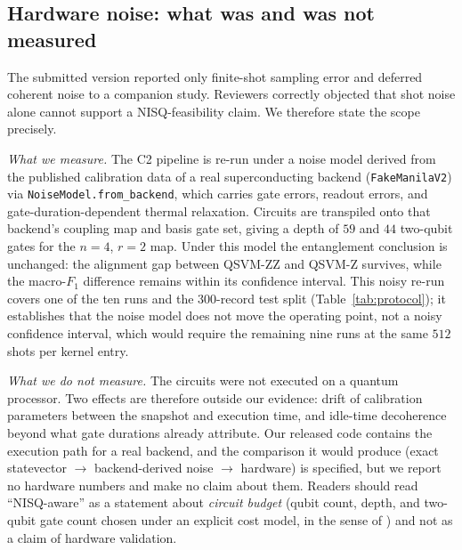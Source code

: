 \subsection{Hardware noise: what was and was not measured}
\begin{revbody}

The submitted version reported only finite-shot sampling error and deferred
coherent noise to a companion study. Reviewers correctly objected that shot
noise alone cannot support a NISQ-feasibility claim. We therefore state the
scope precisely.

\emph{What we measure.} The C2 pipeline is re-run under a noise model derived
from the published calibration data of a real superconducting backend
(\texttt{FakeManilaV2}) \cite{ref27} via \texttt{NoiseModel.from\_backend}, which
carries gate errors, readout errors, and gate-duration-dependent thermal
relaxation.
Circuits are transpiled onto that backend's coupling map and basis gate set,
giving a depth of $59$ and $44$ two-qubit gates for the $n=4$, $r=2$ map.
Under this model the entanglement conclusion is unchanged: the alignment gap
between QSVM-ZZ and QSVM-Z survives, while the macro-$F_1$ difference remains
within its confidence interval. This noisy re-run covers one of the ten runs
and the $300$-record test split (Table~\ref{tab:protocol}); it establishes
that the noise model does not move the operating point, not a noisy confidence
interval, which would require the remaining nine runs at the same $512$ shots
per kernel entry.

\emph{What we do not measure.} The circuits were not executed on a quantum
processor. Two effects are therefore outside our evidence: drift of calibration
parameters between the snapshot and execution time, and idle-time decoherence
beyond what gate durations already attribute. Our released code contains the
execution path for a real backend, and the comparison it would produce
(exact statevector $\rightarrow$ backend-derived noise $\rightarrow$ hardware)
is specified, but we report no hardware numbers and make no claim about them.
Readers should read ``NISQ-aware'' as a statement about \emph{circuit budget}
(qubit count, depth, and two-qubit gate count chosen under an explicit cost
model, in the sense of \cite{ref8}) and not as a claim of hardware validation.
\end{revbody}

